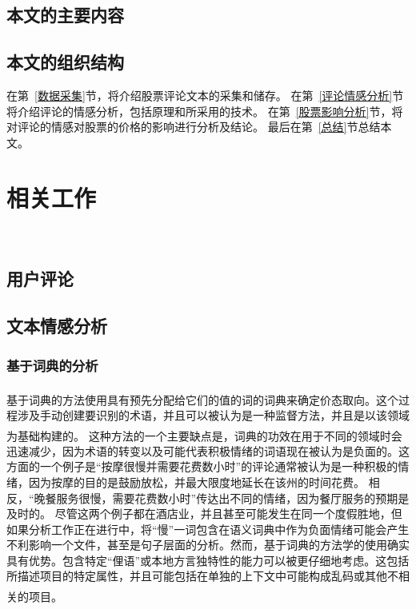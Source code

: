 \documentclass[cs4size,a4paper]{ctexart}
\numberwithin{equation}{section}
\numberwithin{table}{section}
\numberwithin{figure}{section}
\newcommand{\upcite}[1]{\textsuperscript{\textsuperscript{\cite{#1}}}}%
\begin{document}
\subsection{本文的主要内容}


\subsection{本文的组织结构}

在第~\ref{数据采集}节，将介绍股票评论文本的采集和储存。
在第~\ref{评论情感分析}节将介绍评论的情感分析，包括原理和所采用的技术。
在第~\ref{股票影响分析}节，将对评论的情感对股票的价格的影响进行分析及结论。
最后在第~\ref{总结}节总结本文。

\section{相关工作}~\label{related-work}
\subsection{用户评论}



\subsection{文本情感分析}



\subsubsection{基于词典的分析}

基于词典的方法使用具有预先分配给它们的值的词的词典来确定价态取向\upcite{chiu2015opinion}。这个过程涉及手动创建要识别的术语，并且可以被认为是一种监督方法，并且是以该领域为基础构建的\upcite{taboada2011lexicon}。
这种方法的一个主要缺点是，词典的功效在用于不同的领域时会迅速减少，因为术语的转变以及可能代表积极情绪的词语现在被认为是负面的。这方面的一个例子是“按摩很慢并需要花费数小时”的评论通常被认为是一种积极的情绪，因为按摩的目的是鼓励放松，并最大限度地延长在该州的时间花费。
相反，“晚餐服务很慢，需要花费数小时”传达出不同的情绪，因为餐厅服务的预期是及时的。
尽管这两个例子都在酒店业，并且甚至可能发生在同一个度假胜地，但如果分析工作正在进行中，将“慢”一词包含在语义词典中作为负面情绪可能会产生不利影响一个文件，甚至是句子层面的分析。然而，基于词典的方法学的使用确实具有优势。包含特定“俚语”或本地方言独特性的能力可以被更仔细地考虑。这包括所描述项目的特定属性，并且可能包括在单独的上下文中可能构成乱码或其他不相关的项目\upcite{taboada2011lexicon}。
\end{document}
